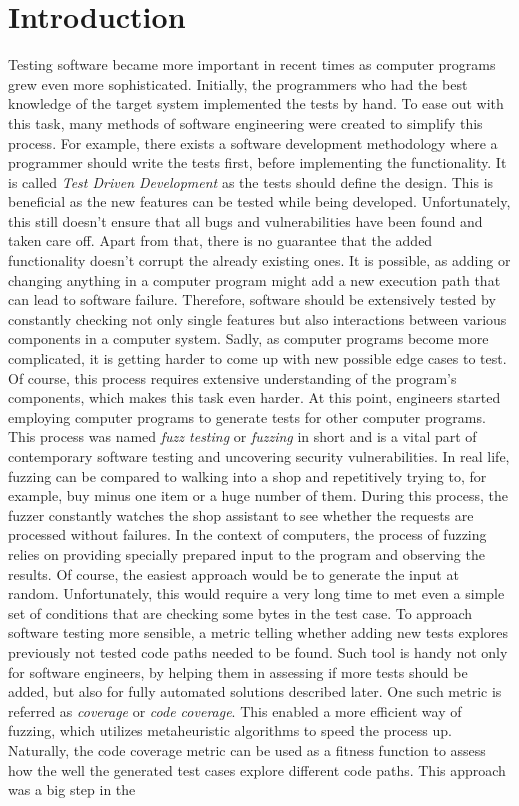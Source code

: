 \clearpage %
\section{Introduction} \label{chap:intr}

Testing software became more important in recent times as computer programs grew even more sophisticated. Initially, the programmers who had the best knowledge of the target system implemented the tests by hand. To ease out with this task, many methods of software engineering were created to simplify this process. For example, there exists a software development methodology where a programmer should write the tests first, before implementing the functionality. It is called \textit{Test Driven Development} as the tests should define the design. This is beneficial as the new features can be tested while being developed. Unfortunately, this still doesn't ensure that all bugs and vulnerabilities have been found and taken care off. Apart from that, there is no guarantee that the added functionality doesn't corrupt the already existing ones. It is possible, as adding or changing anything in a computer program might add a new execution path that can lead to software failure. Therefore, software should be extensively tested by constantly checking not only single features but also interactions between various components in a computer system. Sadly, as computer programs become more complicated, it is getting harder to come up with new possible edge cases to test. Of course, this process requires extensive understanding of the program's components, which makes this task even harder. At this point, engineers started employing computer programs to generate tests for other computer programs. This process was named \textit{fuzz testing} or \textit{fuzzing} in short and is a vital part of contemporary software testing and uncovering security vulnerabilities. In real life, fuzzing can be compared to walking into a shop and repetitively trying to, for example, buy minus one item or a huge number of them. During this process, the fuzzer constantly watches the shop assistant to see whether the requests are processed without failures. In the context of computers, the process of fuzzing relies on providing specially prepared input to the program and observing the results. Of course, the easiest approach would be to generate the input at random. Unfortunately, this would require a very long time to met even a simple set of conditions that are checking some bytes in the test case. To approach software testing more sensible, a metric telling whether adding new tests explores previously not tested code paths needed to be found. Such tool is handy not only for software engineers, by helping them in assessing if more tests should be added, but also for fully automated solutions described later. One such metric is referred as \textit{coverage} or \textit{code coverage}. This enabled a more efficient way of fuzzing, which utilizes metaheuristic algorithms to speed the process up. Naturally, the code coverage metric can be used as a fitness function to assess how the well the generated test cases explore different code paths. This approach was a big step in the 